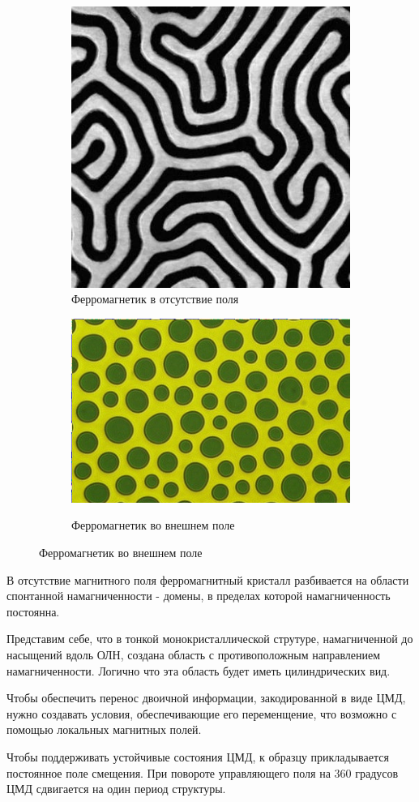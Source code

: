 \documentclass[a4paper, 14pt]{extarticle}
\begin{document}
\begin{figure}[htbp]
    \centering
    \begin{subfigure}{0.4\textwidth}
        \centering
        \includegraphics*[width = 0.5\linewidth]{no_field.jpg}
        \caption{Ферромагнетик в отсутствие поля}
        \label{fig:no_field}
    \end{subfigure}%
    \begin{subfigure}{0.4\textwidth}
        \centering          
        \includegraphics*[width = 0.5\linewidth]{field.png}
        \label{fig:field}   
        \caption{Ферромагнетик во внешнем поле}
    \end{subfigure}
\end{figure}

В отсутствие магнитного поля ферромагнитный кристалл разбивается на области спонтанной
намагниченности - домены, в пределах которой намагниченность постоянна. 

Представим себе, что в тонкой монокристаллической струтуре, намагниченной до 
насыщений вдоль ОЛН, создана область с противоположным направлением намагниченности.
Логично что эта область будет иметь цилиндрических вид. 

Чтобы обеспечить перенос двоичной информации, закодированной в виде ЦМД, нужно создавать 
условия, обеспечивающие его переменщение, что возможно с помощью локальных магнитных полей.

Чтобы поддерживать устойчивые состояния ЦМД, к образцу прикладывается 
постоянное поле смещения. При повороте управляющего поля на $360$ градусов 
ЦМД сдвигается на один период структуры.
\end{document}
